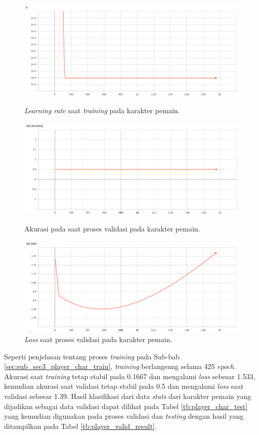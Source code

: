 \begin{figure} [!h] \centering
	\includegraphics[scale=0.44]{img/player_lr_chap4.png}
	\caption{\textit{Learning rate} saat \textit{training} pada karakter pemain.}
	\label{fig:nn_player_lr_chap4}
	\vspace{4ex}
	
	\includegraphics[scale=0.44]{img/player_val_acc_chap4.png}
	\caption{Akurasi pada saat proses validasi pada karakter pemain.}
	\label{fig:nn_player_val_acc_chap4}
	\vspace{4ex}
	
	\includegraphics[scale=0.44]{img/player_val_loss_chap4.png}
	\caption{\textit{Loss} saat proses validasi pada karakter pemain.}
	\label{fig:nn_player_val_loss_chap4}
\end{figure}
\clearpage

Seperti penjelasan tentang proses \textit{training} pada Sub-bab \ref{sec:sub_sec3_player_char_train}, \textit{training} berlangsung selama 425 \textit{epoch}. Akurasi saat \textit{training} tetap stabil pada 0.1667 dan mengalami \textit{loss} sebesar 1.533, kemudian akurasi saat validasi tetap stabil pada 0.5 dan mengalami \textit{loss} saat validasi sebesar 1.39. Hasil klasifikasi dari data \textit{stats} dari karakter pemain yang dijadikan sebagai data validasi dapat dilihat pada Tabel \ref{tb:player_char_test} yang kemudian digunakan pada proses validasi dan \textit{testing} dengan hasil yang ditampilkan pada Tabel \ref{tb:player_valid_result}.
\vspace{-1ex}

